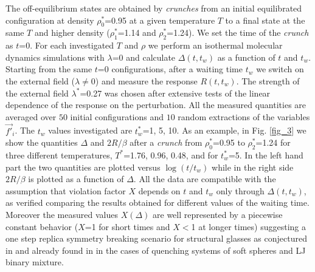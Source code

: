 The off-equilibrium states are obtained by {\it crunches} from an initial
equilibrated configuration at density $\rho^*_0$=0.95 at a given
temperature $T$ to a final state at the same $T$ and higher density
($\rho^*_1$=1.14 and $\rho^*_2$=1.24).
We set the time of the {\it crunch} as $t$=0.
For each investigated $T$ and $\rho$ we perform an isothermal molecular dynamics
simulations with $\lambda$=0 and calculate  $\Delta(t,t_w)$
as a function of $t$ and $t_w$.
Starting from the same $t$=0 configurations, after a waiting time $t_w$
we switch on the external field ($\lambda$$\neq$0) and measure the
response $R(t,t_w)$.
The strength of the external field $\lambda^*$=0.27 was chosen after
extensive tests of the linear dependence of the response on the perturbation.
All the measured quantities are averaged over $50$ initial configurations
and $10$ random extractions of the variables $\vec{f'}_i$.
The $t_w$ values investigated are $t_w^*$=1, 5, 10.
As an example,
in Fig. \ref{fig_3} we show the quantities $\Delta$ and $2R/\beta$ after a
{\it crunch} from $\rho^*_0$=0.95 to $\rho^*_2$=1.24 for three different
temperatures, $T^*$=1.76, 0.96, 0.48, and for $t^*_w$=5.
In the left hand part the two quantities are plotted versus $\log (t/t_w)$
while in the right side $2R/\beta$ is plotted as a function of $\Delta$.
All the data are compatible with the assumption that violation factor $X$
depends on $t$ and $t_w$ only through $\Delta(t,t_w)$, as verified comparing
the results obtained for different values of the waiting time.
Moreover the measured values $X(\Delta)$ are well represented by
a piecewise constant behavior ($X$=1 for short times and
$X$$<$1 at longer times) suggesting a one step replica symmetry
breaking scenario for structural glasses as conjectured in \cite{equiv}
and already found in \cite{PABA} in the cases of quenching systems of soft
spheres and LJ binary mixture.

